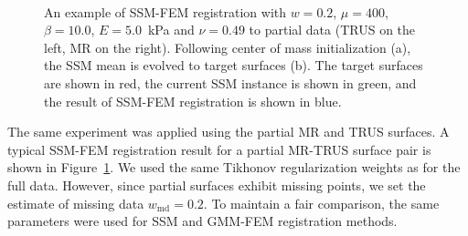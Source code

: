 \documentclass[journal]{IEEEtran}
\begin{document}
\begin{figure}[t]
	\centering
	\\
	\caption{An example of SSM-FEM registration with $w=0.2$, $\mu=400$, $\beta=10.0$, $E=5.0$~kPa and $\nu=0.49$ to partial data (TRUS on the left, MR on the right). Following center of mass initialization (a), the SSM mean is evolved to target surfaces (b). The target surfaces are shown in red, the current SSM instance is shown in green, and the result of SSM-FEM registration is shown in blue.}\label{fig:RegPartial}
\end{figure}
The same experiment was applied using the partial MR and TRUS surfaces.  A typical SSM-FEM registration result for a partial MR-TRUS surface pair is shown in Figure~\ref{fig:RegPartial}. We used the same Tikhonov regularization weights as for the full data. However, since partial surfaces exhibit missing points, we set the estimate of missing data $w_\mathrm{md}=0.2$. To maintain a fair comparison, the same parameters were used for SSM and GMM-FEM registration methods.
\end{document}
